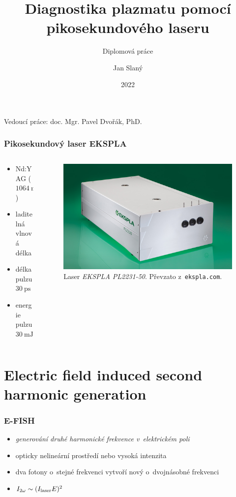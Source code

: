 \documentclass{beamer}
\title[Laserová diagnostika plazmatu]
{Diagnostika plazmatu pomocí pikosekundového laseru}
\subtitle{Diplomová práce}
\date{2022}
\author{Jan Slaný}
\institute[PřF MUNI]{Přírodovědecká fakulta Masarykovy univerzity\\
	Ústav fyzikální elektroniky}
\begin{document}
\begin{frame}[plain]
	\titlepage
	\footnotesize
	Vedoucí práce: \hfill doc. Mgr. Pavel Dvořák, PhD.
\end{frame}

\begin{frame}
	\frametitle{Pikosekundový laser EKSPLA}
	\begin{columns}
	\begin{column}{0.5\textwidth}
		\begin{itemize}
			\item Nd:YAG ($\SI{1064}{\nano\metre}$)
			\item laditelná vlnová délka
			\item délka pulzu $\SI{30}{\pico\second}$
			\item energie pulzu $\SI{30}{\milli\joule}$
		\end{itemize}
	\end{column}
	\begin{column}{0.5\textwidth}
		\begin{figure}
			\centering
			\includegraphics[width=\textwidth]{laser}
			\caption{Laser \emph{EKSPLA PL2231-50}.
				Převzato z~\texttt{ekspla.com}.}
		\end{figure}
	\end{column}
	\end{columns}
\end{frame}

\section[E-FISH]{Electric field induced second harmonic generation}

\begin{frame}
	\frametitle{E-FISH}
	\begin{itemize}
		\item \emph{generování druhé harmonické frekvence v~elektrickém poli}
		\item opticky nelineární prostředí nebo vysoká intenzita
		\item dva fotony o~stejné frekvenci vytvoří nový
			o~dvojnásobné frekvenci
		\item $I_{2\omega} \sim (I_\text{laser} E)^2$
	\end{itemize}
\end{frame}
\end{document}
